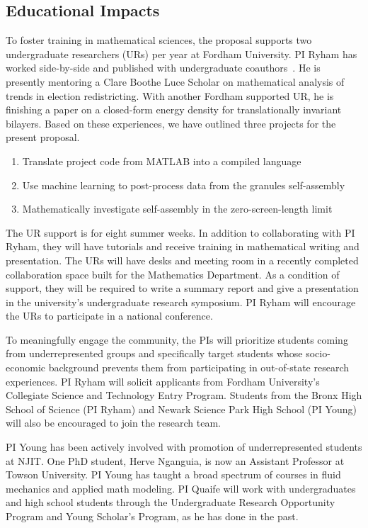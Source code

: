 \subsection{Educational Impacts}
\label{subsec:Educational_plans}
To foster training in mathematical sciences, the proposal supports two
undergraduate researchers (URs) per year at Fordham University. PI Ryham
has worked side-by-side and published with undergraduate
coauthors~\cite{RYHAM20112929, RyWaCo13, RyKlYaCo16}. He is presently
mentoring a Clare Boothe Luce Scholar on mathematical analysis of trends
in election redistricting. With another Fordham supported UR, he is
finishing a paper on a closed-form energy density for translationally
invariant bilayers. Based on these experiences, we have outlined three
projects for the present proposal.
\begin{enumerate}[noitemsep,topsep=0pt]
\item Translate project code from MATLAB into a compiled language 

\item Use machine learning to post-process data from the granules self-assembly

\item Mathematically investigate self-assembly in the zero-screen-length limit
\end{enumerate}
The UR support is for eight summer weeks. In addition to collaborating
with PI Ryham, they will have tutorials and receive training in
mathematical writing and presentation. The URs will have desks and
meeting room in a recently completed collaboration space built for the
Mathematics Department. As a condition of support, they will be required
to write a summary report and give a presentation in the university's
undergraduate research symposium. PI Ryham will encourage the URs to
participate in a national conference.

To meaningfully engage the community, the PIs will prioritize students
coming from underrepresented groups and specifically target students
whose socio-economic background prevents them from participating in
out-of-state research experiences. PI Ryham will solicit applicants from
Fordham University's Collegiate Science and Technology Entry Program.
Students from the Bronx High School of Science (PI Ryham) and Newark
Science Park High School (PI Young) will also be encouraged to join the
research team. 

PI Young has been actively involved with promotion of
underrepresented students at NJIT. One PhD student, Herve Nganguia, is
now an Assistant Professor at Towson University. PI Young has taught a
broad spectrum of courses in fluid mechanics and applied math modeling.
PI Quaife will work with undergraduates and high school
students through the Undergraduate Research Opportunity Program and
Young Scholar's Program, as he has done in the past.


